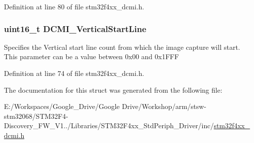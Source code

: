 Definition at line 80 of file stm32f4xx\-\_\-dcmi.\-h.

\hypertarget{struct_d_c_m_i___c_r_o_p_init_type_def_af535547df102beb7e1435eb24cd2e262}{
\subsubsection[{D\-C\-M\-I\-\_\-\-Vertical\-Start\-Line}]{\setlength{\rightskip}{0pt plus 5cm}uint16\-\_\-t D\-C\-M\-I\-\_\-\-Vertical\-Start\-Line}}\label{struct_d_c_m_i___c_r_o_p_init_type_def_af535547df102beb7e1435eb24cd2e262}
Specifies the Vertical start line count from which the image capture will start. This parameter can be a value between 0x00 and 0x1\-F\-F\-F 

Definition at line 74 of file stm32f4xx\-\_\-dcmi.\-h.



The documentation for this struct was generated from the following file\-:\begin{DoxyCompactItemize}
\item 
E\-:/\-Workspaces/\-Google\-\_\-\-Drive/\-Google Drive/\-Workshop/arm/stsw-\/stm32068/\-S\-T\-M32\-F4-\/\-Discovery\-\_\-\-F\-W\-\_\-\-V1../\-Libraries/\-S\-T\-M32\-F4xx\-\_\-\-Std\-Periph\-\_\-\-Driver/inc/\hyperlink{stm32f4xx__dcmi_8h}{stm32f4xx\-\_\-dcmi.\-h}\end{DoxyCompactItemize}
